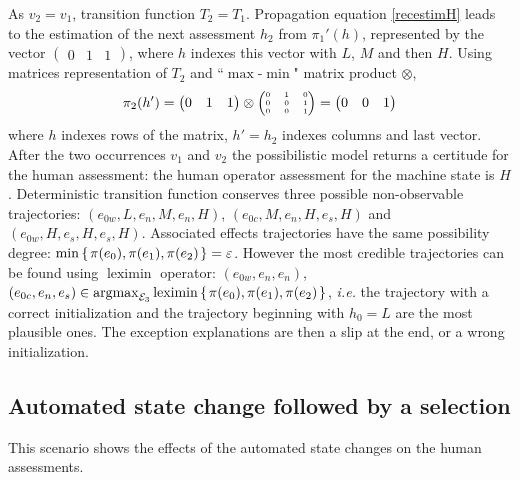 As $v_2=v_1$, transition function $T_2=T_1$. 
Propagation equation \ref{recestimH} leads to 
the estimation of the next assessment $h_2$ from
$ \pi_1'(h)$, represented by the vector
$\begin{pmatrix} 0 & 1 & 1 \end{pmatrix}$,
where $h$ indexes this vector with $L$, $M$ and then $H$.
Using matrices representation of $T_2$ and ``$\max$-$\min$" matrix product $\otimes$,
\[ \pi_2(h') = \begin{pmatrix} 0 & 1 & 1 \end{pmatrix} \otimes \tiny
\begin{pmatrix}
0 & 1 & 0 \\
0 & 0 & 1 \\
0 & 0 & 1 
\end{pmatrix}
\normalsize
= \begin{pmatrix} 0 & 0 & 1 \end{pmatrix}
\]
where $h$ indexes rows of the matrix, $h'=h_2$ indexes columns and last vector.
After the two occurrences $v_1$ and $v_2$ 
the possibilistic model returns a certitude 
for the human assessment:
the human operator assessment for the machine state is $H$.
Deterministic transition function 
conserves three possible non-observable trajectories: 
$(e_{0w},L,e_{n},M,e_{n},H)$, 
$(e_{0c},M,e_{n},H,e_{s},H)$ 
and $(e_{0w},H,e_s,H,e_s,H)$. 
Associated effects trajectories have the same possibility degree: 
$\min \left\{ \left. \pi(e_0), \pi(e_1), \pi(e_2) \right. \right\} = \varepsilon$. 
However the most credible trajectories can be found using $\operatorname*{leximin}$ operator: 
$(e_{0w},e_{n},e_{n})$, $(e_{0c},e_{n},e_{s}) \in \operatorname*{argmax}_{\mathcal{E}_3} \operatorname*{leximin} \left\{ \left.  \pi(e_0),\pi(e_1),\pi(e_2)  \right. \right\}$, 
\textit{i.e.} the trajectory with a correct initialization 
and the trajectory beginning with $h_0=L$ are the most plausible ones.
The exception explanations are then a slip at the end, or a wrong initialization.

\subsection{Automated state change followed by a selection}

This scenario shows the effects of the automated state changes on the human assessments.

